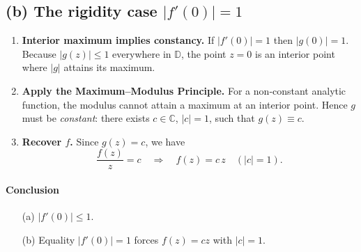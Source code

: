 \documentclass[12pt]{article}
\theoremstyle{definition} %
\theoremstyle{plain} %
\begin{document}
\subsection*{(b)  The rigidity case \boldmath$|f'(0)|=1$}
\begin{enumerate}
\item \textbf{Interior maximum implies constancy.}  
      If $|f'(0)|=1$ then $|g(0)|=1$.  
      Because $|g(z)|\le 1$ everywhere in $\mathbb D$, the point $z=0$
      is an interior point where $|g|$ attains its maximum.

\item \textbf{Apply the Maximum–Modulus Principle.}  
      For a non‑constant analytic function, the modulus cannot attain a
      maximum at an interior point.  
      Hence $g$ must be \emph{constant}: there exists $c\in\mathbb C$,
      $|c|=1$, such that $g(z)\equiv c$.

\item \textbf{Recover $f$.}  
      Since $g(z)=c$, we have
      \[
         \frac{f(z)}{z}=c
         \quad\Longrightarrow\quad
         f(z)=c\,z \quad(|c|=1).
      \]
\end{enumerate}

\paragraph{Conclusion}  
\begin{itemize}
  \item[(a)] $|f'(0)|\le 1$.
  \item[(b)] Equality $|f'(0)|=1$ forces $f(z)=c z$ with $|c|=1$.
\end{itemize}
\end{document}
